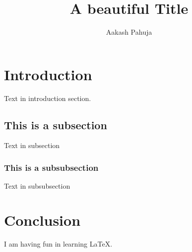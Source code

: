 \documentclass{article}
\title{A beautiful Title}
\author{Aakash Pahuja}
\begin{document}
\maketitle

\section{Introduction}

Text in introduction section.

\subsection{This is a subsection}

Text in subsection

\subsubsection{This is a subsubsection}

Text in subsubsection

\section{Conclusion}

I am having fun in learning \LaTeX.
\end{document}
